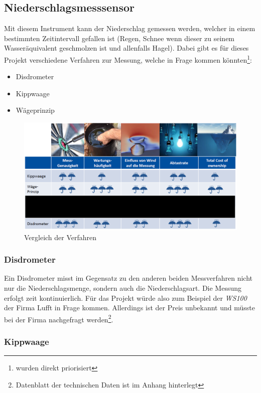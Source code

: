\subsection{Niederschlagsmesssensor}
Mit diesem Instrument kann der Niederschlag gemessen werden, welcher in einem bestimmten Zeitintervall gefallen ist (Regen, Schnee wenn dieser zu seinem Wasseräquivalent geschmolzen ist und allenfalls Hagel). Dabei gibt es für dieses Projekt verschiedene Verfahren zur Messung, welche in Frage kommen könnten\footnote{wurden direkt priorisiert}:
\begin{itemize}
\item[1.] Disdrometer
\item[2.] Kippwaage
\item[3.] Wägeprinzip
\end{itemize}
\begin{figure}[hbtp]
\centering
\includegraphics[width=\textwidth]{graphics/vergleich_verfahren.PNG}
\caption{Vergleich der Verfahren}
\label{vergleich_der_verfahren}
\end{figure}

\subsubsection{Disdrometer}
Ein Disdrometer misst im Gegensatz zu den anderen beiden Messverfahren nicht nur die Niederschlagsmenge, sondern auch die Niederschlagsart. Die Messung erfolgt zeit kontinuierlich. Für das Projekt würde also zum Beispiel der \textit{WS100} der Firma Lufft in Frage kommen. Allerdings ist der Preis unbekannt und müsste bei der Firma nachgefragt werden\footnote{Datenblatt der technischen Daten ist im Anhang hinterlegt}.

\subsubsection{Kippwaage}